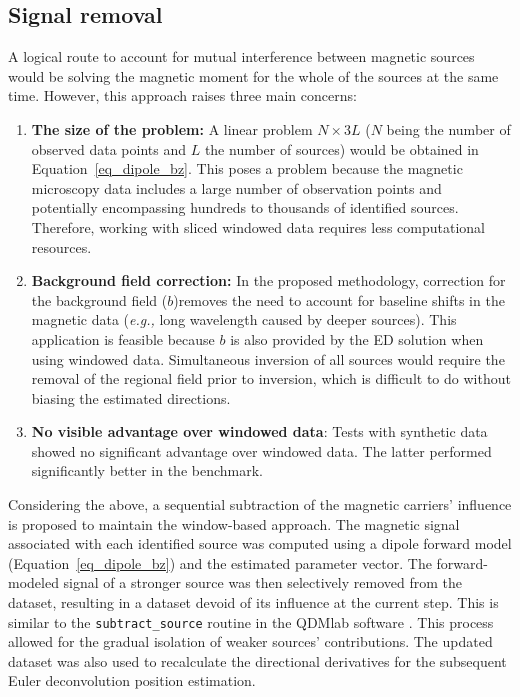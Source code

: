 \subsection{Signal removal}
\label{sec:signal_removal}

    A logical route to account for mutual interference between magnetic sources would be solving the magnetic moment for the whole of the sources at the same time. However, this approach raises three main concerns:
    
    \begin{enumerate}
        \item \textbf{The size of the problem:} A linear problem $N \times 3L$ ($N$ being the number of observed data points and $L$ the number of sources) would be obtained in Equation~\ref{eq_dipole_bz}. This poses a problem because the magnetic microscopy data includes a large number of observation points and potentially encompassing hundreds to thousands of identified sources. Therefore, working with sliced windowed data requires less computational resources.
        
        \item \textbf{Background field correction:} In the proposed methodology, correction for the background field ($b$)removes the need to account for baseline shifts in the magnetic data (\textit{e.g.,} long wavelength caused by deeper sources). This application is feasible because $b$ is also provided by the ED solution when using windowed data. Simultaneous inversion of all sources would require the removal of the regional field prior to inversion, which is difficult to do without biasing the estimated directions.
        
        \item \textbf{No visible advantage over windowed data}: Tests with synthetic data \citep[see supplementary Jupyter notebooks in][]{figshare} showed no significant advantage over windowed data. The latter performed significantly better in the benchmark.

    \end{enumerate}
    
    Considering the above, a sequential subtraction of the magnetic carriers' influence is proposed to maintain the window-based approach. The magnetic signal associated with each identified source was computed using a dipole forward model (Equation~\ref{eq_dipole_bz}) and the estimated parameter vector. The forward-modeled signal of a stronger source was then selectively removed from the dataset, resulting in a dataset devoid of its influence at the current step. 
    This is similar to the \texttt{subtract\_source} routine in the QDMlab software \citep{Volk2022}. This process allowed for the gradual isolation of weaker sources' contributions. The updated dataset was also used to recalculate the directional derivatives for the subsequent Euler deconvolution position estimation.

